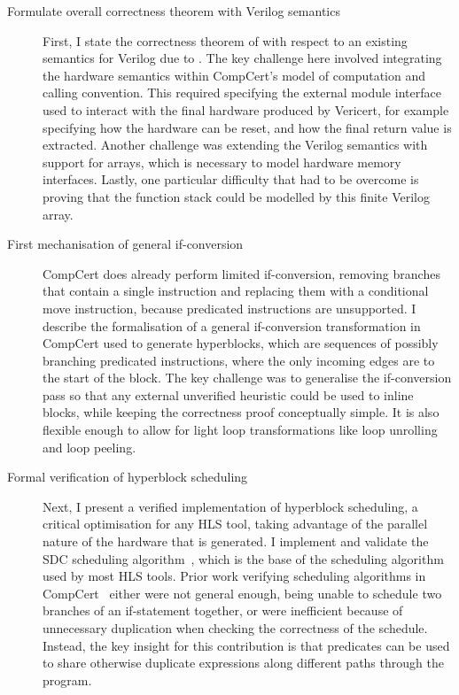 \begin{description}
\item[Formulate overall correctness theorem with Verilog semantics] First, I
  state the correctness theorem of \vericert{} with respect to an existing
  semantics for Verilog due to \textcite{lööw19_proof_trans_veril_devel_hol}.
  The key challenge here involved integrating the hardware semantics within
  CompCert's model of computation and calling convention.  This required
  specifying the external module interface used to interact with the final
  hardware produced by Vericert, for example specifying how the hardware can be
  reset, and how the final return value is extracted.  Another challenge was
  extending the Verilog semantics with support for arrays, which is necessary to
  model hardware memory interfaces.  Lastly, one particular difficulty that had
  to be overcome is proving that the function stack could be modelled by this
  finite Verilog array.

\item[First mechanisation of general if-conversion] CompCert does already
  perform limited if-conversion, removing branches that contain a single
  instruction and replacing them with a conditional move instruction, because
  predicated instructions are unsupported.  I describe the formalisation of a
  general if-conversion transformation in CompCert used to generate hyperblocks,
  which are sequences of possibly branching predicated instructions, where the
  only incoming edges are to the start of the block.  The key challenge was to
  generalise the if-conversion pass so that any external unverified heuristic
  could be used to inline blocks, while keeping the correctness proof
  conceptually simple.  It is also flexible enough to allow for light loop
  transformations like loop unrolling and loop peeling.

\item[Formal verification of hyperblock scheduling] Next, I present a verified
  implementation of hyperblock scheduling, a critical optimisation for any
  \gls{HLS} tool, taking advantage of the parallel nature of the hardware that
  is generated.  I implement and validate the \gls{SDC} scheduling
  algorithm~\cite{cong06_sdc}, which is the base of the scheduling algorithm
  used by most \gls{HLS} tools.  Prior work verifying scheduling algorithms in
  CompCert~\cite{tristan08_formal_verif_trans_valid,
    six22_formal_verif_super_sched} either were not general enough, being unable
  to schedule two branches of an if-statement together, or were inefficient
  because of unnecessary duplication when checking the correctness of the
  schedule.  Instead, the key insight for this contribution is that predicates
  can be used to share otherwise duplicate expressions along different paths
  through the program.


\end{description}
